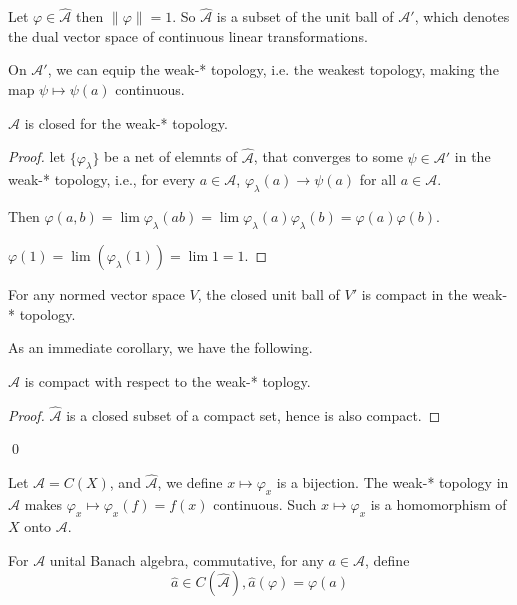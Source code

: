 Let $\varphi\in\widehat{\mathcal{A}}$ then $\|\varphi\|=1$. So $\widehat{\mathcal{A}}$ is a subset of the unit ball of $\mathcal{A}'$, which denotes the dual vector space of continuous linear transformations.


On $\mathcal{A}'$, we can equip the weak-* topology, i.e. the weakest topology, making the map $\psi\mapsto\psi(a)$ continuous. 

\begin{proposition}
    $\widehat{\mathcal{A}}$ is closed for the weak-* topology.
\end{proposition}
\begin{proof}
    let $\{\varphi_\lambda\}$ be a net of elemnts of $\widehat{\mathcal{A}}$, that converges to some $\psi\in\mathcal{A}'$ in the weak-* topology, i.e., for every $a\in\mathcal{A}$, $\varphi_\lambda(a)\to\psi(a)$ for all $a\in\mathcal{A}$.

    Then $\varphi(a,b)=\lim\varphi_\lambda(ab)=\lim\varphi_\lambda(a)\varphi_\lambda(b)=\varphi(a)\varphi(b)$.

    $\varphi(1)=\lim(\varphi_\lambda(1))=\lim 1=1$.
\end{proof}

\begin{theorem}
    For any normed vector space $V$, the closed unit ball of $V'$ is compact in the weak-* topology. 
\end{theorem}
As an immediate corollary, we have the following.
\begin{corollary}
    $\widehat{\mathcal{A}}$ is compact with respect to the weak-* toplogy.
\end{corollary}
\begin{proof}
    $\widehat{\mathcal{A}}$ is a closed subset of a compact set, hence is also compact.
\end{proof}
\qed

Let $\mathcal{A}=C(X)$, and $\widehat{\mathcal{A}}$, we define $x\mapsto\varphi_x$ is a bijection. The weak-* topology in $\widehat{\mathcal{A}}$ makes $\varphi_x\mapsto\varphi_x(f)=f(x)$ continuous. Such $x\mapsto\varphi_x$ is a homomorphism of $X$ onto $\mathcal{A}$.

For $\mathcal{A}$ unital Banach algebra, commutative, for any $a\in\mathcal{A}$, define
\begin{equation*}
    \widehat{a}\in C(\widehat{\mathcal{A}}), \widehat{a}(\varphi)=\varphi(a)
\end{equation*}

